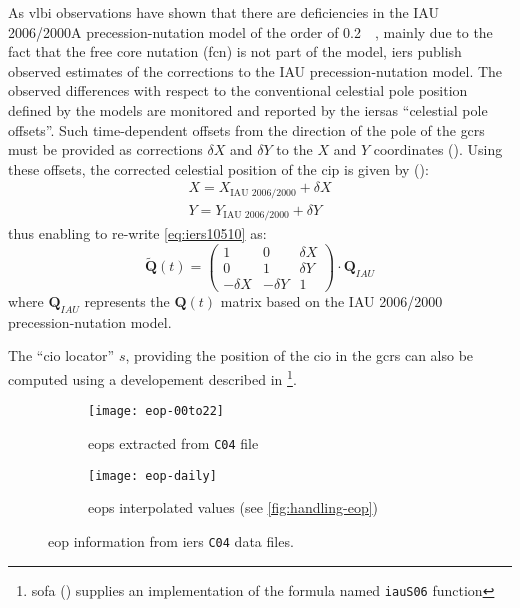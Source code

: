 As \gls{vlbi} observations have shown that there are deficiencies in the 
IAU 2006/2000A precession-nutation model of the order of \SI{0.2}{\milli\larcsecond}, 
mainly due to the fact that the free core nutation (\gls{fcn}) is not part of 
the model, \gls{iers} publish observed estimates of the corrections to the 
IAU precession-nutation model. The observed differences with respect to the 
conventional celestial pole position defined by the models are monitored and 
reported by the \gls{iers}as ``celestial pole offsets''. Such time-dependent 
offsets from the direction of the pole of the \gls{gcrs} must be provided as 
corrections $\delta X$ and $\delta Y$ to the $X$ and $Y$ coordinates (\cite{iers2010}).
Using these offsets, the corrected celestial position of the \gls{cip} is 
given by (\cite{iers2010}):
\begin{equation}
  \begin{aligned}
    X = X_{\text{IAU 2006/2000}} + \delta X \\
    Y = Y_{\text{IAU 2006/2000}} + \delta Y
  \end{aligned}
\end{equation}
thus enabling to re-write \ref{eq:iers10510} as:
\begin{equation}
  \bm{\tilde{Q}}(t) = \begin{pmatrix}
    1 & 0 & \delta X \\
    0 & 1 & \delta Y \\
    -\delta X & -\delta Y & 1
    \end{pmatrix}
    \cdot \bm{Q}_{IAU}
    \label{eq:iers10527}
\end{equation}
where $\bm{Q}_{IAU}$ represents the $\bm{Q}(t)$ matrix based on the IAU 2006/2000 
precession-nutation model.

The ``\gls{cio} locator'' $s$, providing the position of the \gls{cio} in the 
\gls{gcrs} can also be computed using a developement described in \cite{Capitaineetal2003a}\footnote{\gls{sofa} (\cite{SOFA20210125}) supplies an implementation of the formula named \texttt{iauS06} function}.

\begin{figure}
     \centering
     \begin{subfigure}[b]{0.48\textwidth}
         \centering
         \texttt{[image: eop-00to22]}
         \caption{\glspl{eop} extracted from \texttt{C04} file}
         \label{fig:erp-00to22}
     \end{subfigure}
     \hfill
     \begin{subfigure}[b]{0.48\textwidth}
         \centering
         \texttt{[image: eop-daily]}
         \caption{\glspl{eop} interpolated values (see \ref{fig:handling-eop})}
         \label{fig:erp-00to22}
     \end{subfigure}
\caption{\gls{eop} information from \gls{iers} \texttt{C04} data files.}
\label{fig:erp-plots}
\end{figure}

